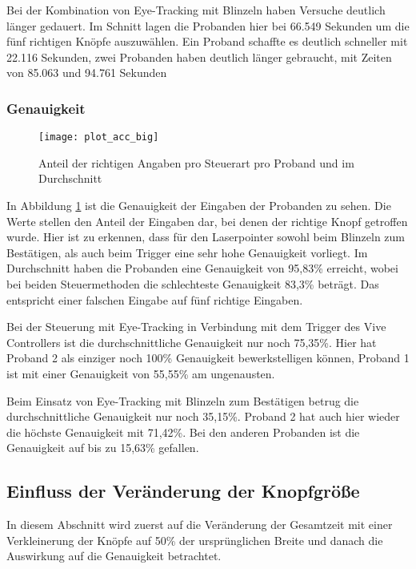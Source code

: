 Bei der Kombination von Eye-Tracking mit Blinzeln haben Versuche deutlich länger gedauert. Im Schnitt lagen die Probanden hier bei 66.549 Sekunden um die fünf richtigen Knöpfe auszuwählen. Ein Proband schaffte es deutlich schneller mit 22.116 Sekunden, zwei Probanden haben deutlich länger gebraucht, mit Zeiten von 85.063 und 94.761 Sekunden

\subsubsection{Genauigkeit}

\begin{figure}[!htbp]
	\centering
	\texttt{[image: plot\_acc\_big]}
	\caption[Anteil der richtigen Angaben pro Steuerart pro Proband und im Durchschnitt]{Anteil der richtigen Angaben pro Steuerart pro Proband und im Durchschnitt}
	\label{fig:totalACCBig}
\end{figure}
In Abbildung \ref{fig:totalACCBig} ist die Genauigkeit der Eingaben der Probanden zu sehen. Die Werte stellen den Anteil der Eingaben dar, bei denen der richtige Knopf getroffen wurde. Hier ist zu erkennen, dass  für den Laserpointer sowohl beim Blinzeln zum Bestätigen, als auch beim Trigger eine sehr hohe Genauigkeit vorliegt. Im Durchschnitt haben die Probanden eine Genauigkeit von 95,83\% erreicht, wobei bei beiden Steuermethoden die schlechteste Genauigkeit 83,3\% beträgt. Das entspricht einer falschen Eingabe auf fünf richtige Eingaben.

Bei der Steuerung mit Eye-Tracking in Verbindung mit dem Trigger des Vive Controllers ist die durchschnittliche Genauigkeit nur noch 75,35\%. Hier hat Proband 2 als einziger noch 100\% Genauigkeit bewerkstelligen können, Proband 1 ist mit einer Genauigkeit von 55,55\% am ungenausten. 

Beim Einsatz von Eye-Tracking mit Blinzeln zum Bestätigen betrug die durchschnittliche Genauigkeit nur noch 35,15\%. Proband 2 hat auch hier wieder die höchste Genauigkeit mit 71,42\%. Bei den anderen Probanden ist die Genauigkeit auf bis zu 15,63\% gefallen. 



\subsection{Einfluss der Veränderung der Knopfgröße}
In diesem Abschnitt wird zuerst auf die Veränderung der Gesamtzeit mit einer Verkleinerung der Knöpfe auf 50\% der ursprünglichen Breite und danach die Auswirkung auf die Genauigkeit betrachtet. 
